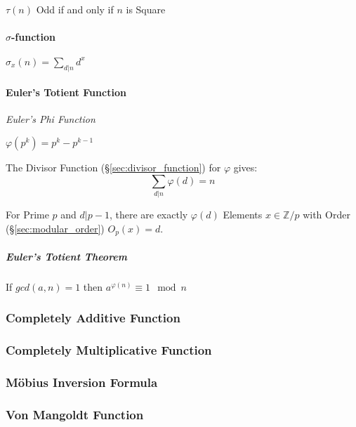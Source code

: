$\tau(n)$ Odd if and only if $n$ is Square



\paragraph{$\sigma$-function}\label{sec:sigma_function}\hfill

$\sigma_x(n) = \sum_{d | n} d^x$



\paragraph{Euler's Totient Function}\label{sec:eulers_totient}\hfill

\emph{Euler's Phi Function}

$\varphi(p^k) = p^k - p^{k-1}$

The Divisor Function (\S\ref{sec:divisor_function}) for $\varphi$
gives:
\[
  \sum_{d|n}\varphi(d) = n
\]

For Prime $p$ and $d|p-1$, there are exactly $\varphi(d)$ Elements $x
\in \mathbb{Z}/p$ with Order (\S\ref{sec:modular_order}) $O_p(x) = d$.

\subparagraph{Euler's Totient Theorem}\label{sec:totient_theorem}\hfill

If $gcd(a,n) = 1$ then $a^{\varphi(n)} \equiv 1 \mod n$



\subsubsection{Completely Additive Function}
\label{sec:completely_additive_function}

\subsubsection{Completely Multiplicative Function}
\label{sec:completely_multiplicative_function}

\subsubsection{M\"obius Inversion Formula}
\label{sec:mobius_inversion}

\subsubsection{Von Mangoldt Function}\label{sec:vonmangoldt_function}

